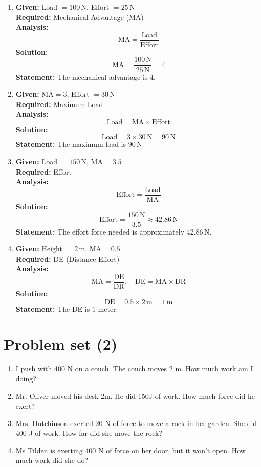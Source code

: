 \documentclass{article}
\begin{document}
\begin{enumerate}
    \item \textbf{Given:} Load $= 100\,\mathrm{N}$, Effort $= 25\,\mathrm{N}$ \\
    \textbf{Required:} Mechanical Advantage (MA) \\
    \textbf{Analysis:}
    \[
        \mathrm{MA} = \frac{\text{Load}}{\text{Effort}}
    \]
    \textbf{Solution:}
    \[
        \mathrm{MA} = \frac{100\,\mathrm{N}}{25\,\mathrm{N}} = 4
    \]
    \textbf{Statement:} The mechanical advantage is $4$.

    \item \textbf{Given:} $\mathrm{MA} = 3$, Effort $= 30\,\mathrm{N}$ \\
    \textbf{Required:} Maximum Load \\
    \textbf{Analysis:}
    \[
        \text{Load} = \mathrm{MA} \times \text{Effort}
    \]
    \textbf{Solution:}
    \[
        \text{Load} = 3 \times 30\,\mathrm{N} = 90\,\mathrm{N}
    \]
    \textbf{Statement:} The maximum load is $90\,\mathrm{N}$.

    \item \textbf{Given:} Load $= 150\,\mathrm{N}$, $\mathrm{MA} = 3.5$ \\
    \textbf{Required:} Effort \\
    \textbf{Analysis:}
    \[
        \text{Effort} = \frac{\text{Load}}{\mathrm{MA}}
    \]
    \textbf{Solution:}
    \[
        \text{Effort} = \frac{150\,\mathrm{N}}{3.5} \approx 42.86\,\mathrm{N}
    \]
    \textbf{Statement:} The effort force needed is approximately $42.86\,\mathrm{N}$.

    \item \textbf{Given:} Height $= 2\,\mathrm{m}$, $\mathrm{MA} = 0.5$ \\
    \textbf{Required:} DE (Distance Effort) \\
    \textbf{Analysis:}
    \[
        \mathrm{MA} = \frac{\mathrm{DE}}{\mathrm{DR}}, \quad \mathrm{DE} = \mathrm{MA} \times \mathrm{DR}
    \]
    \textbf{Solution:}
    \[
        \mathrm{DE} = 0.5 \times 2\,\mathrm{m} = 1\,\mathrm{m}
    \]
    \textbf{Statement:} The DE is $1$ meter.
\end{enumerate}

\section*{Problem set (2)}

\begin{enumerate}
    \item I push with 400 N on a couch. The couch moves 2 m. How much work am I doing?
    \item Mr. Oliver moved his desk 2m. He did 150J of work. How much force did he exert?
    \item Mrs. Hutchinson exerted 20 N of force to move a rock in her garden. She did 400 J of work. How far did she move the rock?
    \item Ms Tilden is exerting 400 N of force on her door, but it won't open. How much work did she do?
\end{enumerate}
\end{document}
